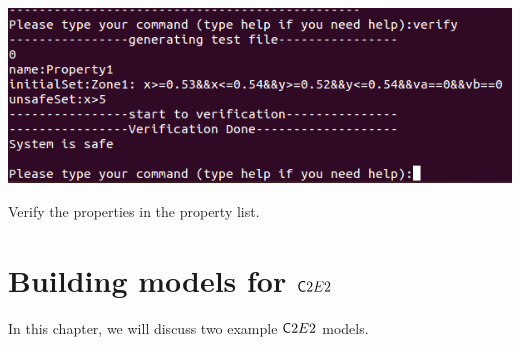 \documentclass{tufte-book} %
\begin{document}

 \begin{marginfigure}
  \centerline{\includegraphics[scale=.25,keepaspectratio=true]{Manual_ver0_2_image/terminal_verify.png}}
  \caption{Verify the properties in the property list.} 
   \label{figure:terminalverify}
 \end{marginfigure}

\chapter{Building models for ${{\mathsf C2E2}}$}
\label{sec:plots}
In this chapter, we will discuss two example ${{\mathsf C2E2}}$ models. 
\end{document}
